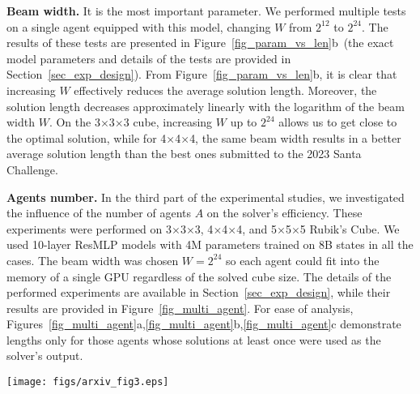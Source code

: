 {\bf Beam width.} It is the most important parameter. We performed multiple tests on a single agent equipped with this model, changing $W$ from $2^{12}$ to $2^{24}$. The results of these tests are presented in Figure~\ref{fig_param_vs_len}b~(the exact model parameters and details of the tests are provided in Section~\ref{sec_exp_design}). From Figure~\ref{fig_param_vs_len}b, it is clear that increasing $W$ effectively reduces the average solution length. Moreover, the solution length decreases approximately linearly with the logarithm of the beam width  $W$. On the 3$\times$3$\times$3 cube, increasing $W$ up to $2^{24}$ allows us to get close to the optimal solution, while for 4$\times$4$\times$4, the same beam width results in a better average solution length than the best ones submitted to the 2023 Santa Challenge. 

{\bf Agents number.} In the third part of the experimental studies, we investigated the influence of the number of agents $A$ on the solver's efficiency. These experiments were performed on 3$\times$3$\times$3, 4$\times$4$\times$4, and 5$\times$5$\times$5 Rubik's Cube. We used 10-layer ResMLP models with 4M parameters trained on 8B states in all the cases. The beam width was chosen $W=2^{24}$ so each agent could fit into the memory of a single GPU regardless of the solved cube size. The details of the performed experiments are available in Section~\ref{sec_exp_design}, while their results are provided in Figure~\ref{fig_multi_agent}. For ease of analysis, Figures~\ref{fig_multi_agent}a,\ref{fig_multi_agent}b,\ref{fig_multi_agent}c demonstrate lengths only for those agents whose solutions at least once were used as the solver's output.

\begin{figure*}[ht]
\centering
\texttt{[image: figs/arxiv\_fig3.eps]}
\caption{ Average solution length of the proposed multi-agent approach depending on the number of agents composing its output for (c)~3$\times$3$\times$3, (e)~4$\times$4$\times$4, and (f)~5$\times$5$\times$5 Rubik's cubes. Solid line -- random set of the agents, dashed line -- best set. Distribution of solution lengths for (c)~3$\times$3$\times$3, (d)~4$\times$4$\times$4, and (e)~5$\times$5$\times$5 Rubik's cubes for the best ensemble. }\label{fig_multi_agent}
\end{figure*}

